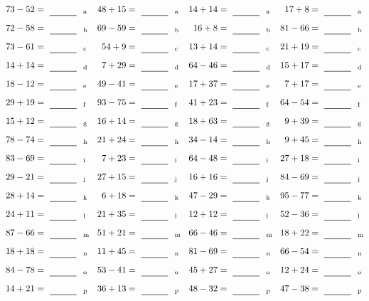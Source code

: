 \documentclass
[
  draft    = true,
  fontsize = 11pt,
  parskip  = half-
]
{scrartcl}
\begin{document}
\clearpage
\begin{align*}
    \pline{73-52}&=\rline{a}
  & \pline{48+15}&=\rline{a}
  & \pline{14+14}&=\rline{a}
  & \pline{17+8}&=\rline{a} \\[1ex]
    \pline{72-58}&=\rline{b}
  & \pline{69-59}&=\rline{b}
  & \pline{16+8}&=\rline{b}
  & \pline{81-66}&=\rline{b} \\[1ex]
    \pline{73-61}&=\rline{c}
  & \pline{54+9}&=\rline{c}
  & \pline{13+14}&=\rline{c}
  & \pline{21+19}&=\rline{c} \\[1ex]
    \pline{14+14}&=\rline{d}
  & \pline{7+29}&=\rline{d}
  & \pline{64-46}&=\rline{d}
  & \pline{15+17}&=\rline{d} \\[1ex]
    \pline{18-12}&=\rline{e}
  & \pline{49-41}&=\rline{e}
  & \pline{17+37}&=\rline{e}
  & \pline{7+17}&=\rline{e} \\[1ex]
    \pline{29+19}&=\rline{f}
  & \pline{93-75}&=\rline{f}
  & \pline{41+23}&=\rline{f}
  & \pline{64-54}&=\rline{f} \\[1ex]
    \pline{15+12}&=\rline{g}
  & \pline{16+14}&=\rline{g}
  & \pline{18+63}&=\rline{g}
  & \pline{9+39}&=\rline{g} \\[1ex]
    \pline{78-74}&=\rline{h}
  & \pline{21+24}&=\rline{h}
  & \pline{34-14}&=\rline{h}
  & \pline{9+45}&=\rline{h} \\[1ex]
    \pline{83-69}&=\rline{i}
  & \pline{7+23}&=\rline{i}
  & \pline{64-48}&=\rline{i}
  & \pline{27+18}&=\rline{i} \\[1ex]
    \pline{29-21}&=\rline{j}
  & \pline{27+15}&=\rline{j}
  & \pline{16+16}&=\rline{j}
  & \pline{84-69}&=\rline{j} \\[1ex]
    \pline{28+14}&=\rline{k}
  & \pline{6+18}&=\rline{k}
  & \pline{47-29}&=\rline{k}
  & \pline{95-77}&=\rline{k} \\[1ex]
    \pline{24+11}&=\rline{l}
  & \pline{21+35}&=\rline{l}
  & \pline{12+12}&=\rline{l}
  & \pline{52-36}&=\rline{l} \\[1ex]
    \pline{87-66}&=\rline{m}
  & \pline{51+21}&=\rline{m}
  & \pline{66-46}&=\rline{m}
  & \pline{18+22}&=\rline{m} \\[1ex]
    \pline{18+18}&=\rline{n}
  & \pline{11+45}&=\rline{n}
  & \pline{81-69}&=\rline{n}
  & \pline{66-54}&=\rline{n} \\[1ex]
    \pline{84-78}&=\rline{o}
  & \pline{53-41}&=\rline{o}
  & \pline{45+27}&=\rline{o}
  & \pline{12+24}&=\rline{o} \\[1ex]
    \pline{14+21}&=\rline{p}
  & \pline{36+13}&=\rline{p}
  & \pline{48-32}&=\rline{p}
  & \pline{47-38}&=\rline{p}
\end{align*}
\end{document}
